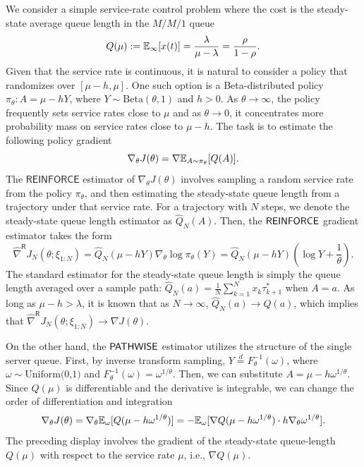 We consider a simple service-rate control problem where the cost is the steady-state average queue length in the $M/M/1$ queue
\[
Q(\mu) := \mathbb{E}_{\infty}[x(t)] = \frac{\lambda}{\mu - \lambda} = \frac{\rho}{1-\rho}.
\]
Given that the service rate is continuous, it is natural to consider a policy that randomizes over $[\mu - h, \mu]$. One such option is a Beta-distributed policy $\pi_{\theta}: A = \mu - hY$, where $Y \sim \text{Beta}(\theta,1)$ and $h>0$. As $\theta \to \infty$, the policy frequently sets service rates close to $\mu$ and as $\theta \to 0$, it concentrates more probability mass on service rates close to $\mu - h$. The task is to estimate the following policy gradient
\[
\nabla_{\theta} J(\theta) = \nabla \mathbb{E}_{A\sim \pi_{\theta}}[Q(A)].
\]
The $\mathsf{REINFORCE}$ estimator of $\nabla_{\theta}J(\theta)$ involves sampling a random service rate from the policy $\pi_{\theta}$, and then estimating the steady-state queue length from a trajectory under that service rate. For a trajectory with $N$ steps, we denote the steady-state queue length estimator as $\widehat{Q}_{N}(A)$. Then, the $\mathsf{REINFORCE}$ gradient estimator takes the form
\begin{equation}
\label{eq:mm1-reinforce}
\widehat{\nabla}^{\mathsf{R}} J_{N}(\theta; \xi_{1:N})
= \widehat{Q}_{N}(\mu - hY) \nabla_{\theta} \log \pi_{\theta}(Y) 
= \widehat{Q}_{N}(\mu - hY) \left( \log Y + \frac{1}{\theta} \right).
\end{equation}
The standard estimator for the steady-state queue length is simply the queue length averaged over a sample path: 
$\widehat{Q}_{N}(a) = \frac{1}{N}\sum_{k=1}^{N}x_{k}\tau_{k+1}^*$ when $A=a$. As long as $\mu - h > \lambda$, it is known that as $N\to \infty$, $\widehat{Q}_{N}(a) \to Q(a)$, which implies that $\widehat{\nabla}^{\mathsf{R}} J_{N}(\theta; \xi_{1:N}) \to \nabla J(\theta)$.

On the other hand, the $\mathsf{PATHWISE}$ estimator utilizes the structure of the single server queue. First, by inverse transform sampling, $Y \stackrel{d}{=} F_{\theta}^{-1}(\omega)$, where $\omega \sim \text{Uniform(0,1)}$ and $F_{\theta}^{-1}(\omega) = \omega^{1/\theta}$. Then, we can substitute $A = \mu - h\omega^{1/\theta}$. Since $Q(\mu)$ is differentiable and the derivative is integrable, we can change the order of differentiation and integration
\[
\nabla_{\theta} J(\theta) 
= \nabla_{\theta} \mathbb{E}_{\omega}[Q(\mu - h\omega^{1/\theta})]
= -\mathbb{E}_{\omega}[\nabla Q(\mu - h\omega^{1/\theta}) \cdot h \nabla_{\theta} \omega^{1/\theta}].
\]
The preceding display involves the gradient of the steady-state queue-length $Q(\mu)$ with respect to the service rate $\mu$, i.e., $\nabla Q(\mu)$. 

